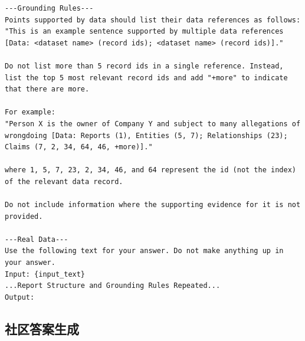 \documentclass[11pt,UTF8,fontset=fandol]{ctexart}
\begin{document}
\begin{lstlisting}[style=promptstyle]
---Grounding Rules---
Points supported by data should list their data references as follows:
"This is an example sentence supported by multiple data references [Data: <dataset name> (record ids); <dataset name> (record ids)]."

Do not list more than 5 record ids in a single reference. Instead, list the top 5 most relevant record ids and add "+more" to indicate that there are more.

For example:
"Person X is the owner of Company Y and subject to many allegations of wrongdoing [Data: Reports (1), Entities (5, 7); Relationships (23); Claims (7, 2, 34, 64, 46, +more)]."

where 1, 5, 7, 23, 2, 34, 46, and 64 represent the id (not the index) of the relevant data record.

Do not include information where the supporting evidence for it is not provided.

---Real Data---
Use the following text for your answer. Do not make anything up in your answer.
Input: {input_text}
...Report Structure and Grounding Rules Repeated...
Output:
\end{lstlisting}

\subsection{社区答案生成}
\end{document}
